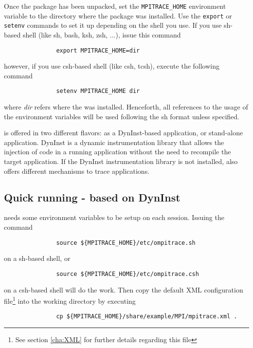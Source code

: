 Once the package has been unpacked, set the {\tt MPITRACE\_HOME} environment variable to the directory where the package was installed. Use the {\tt export} or {\tt setenv} commands to set it up depending on the shell you use.  If you use sh-based shell (like sh, bash, ksh, zsh, ...), issue this command
\begin{verbatim}
               export MPITRACE_HOME=dir
\end{verbatim}
however, if you use csh-based shell (like csh, tcsh), execute the following command
\begin{verbatim}
               setenv MPITRACE_HOME dir
\end{verbatim}
where {\em dir} refers where the \TRACE was installed. Henceforth, all references to the usage of the environment variables will be used following the sh format unless specified.

\TRACE is offered in two different flavors: as a DynInst-based application, or stand-alone application. DynInst is a dynamic instrumentation library that allows the injection of code in a running application without the need to recompile the target application. If the DynInst instrumentation library is not installed, \TRACE also offers different mechanisms to trace applications.

\subsection{Quick running \TRACE - based on DynInst}\label{subsec:RunningTraceDynInst}

\TRACE needs some environment variables to be setup on each session. Issuing the command 

\begin{verbatim}
               source ${MPITRACE_HOME}/etc/ompitrace.sh
\end{verbatim}

on a sh-based shell, or 

\begin{verbatim}
               source ${MPITRACE_HOME}/etc/ompitrace.csh
\end{verbatim}

on a csh-based shell will do the work. Then copy the default XML configuration file\footnote{See section \ref{cha:XML} for further details regarding this file} into the working directory by executing

\begin{verbatim}
               cp ${MPITRACE_HOME}/share/example/MPI/mpitrace.xml .
\end{verbatim}

